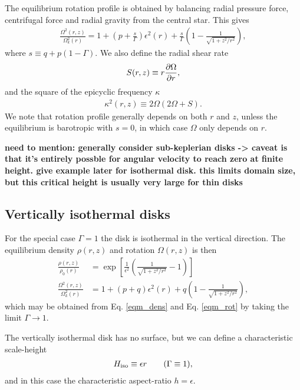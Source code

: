 The equilibrium rotation profile is obtained by balancing radial
pressure force, centrifugal force and radial gravity from the central
star. This gives 
\begin{align}\label{eqm_rot}
  \frac{\Omega^2(r,z)}{\Omega_k^2(r)}=1 +
  \left(p+\frac{s}{\Gamma}\right)\epsilon^2(r) 
  +\frac{s}{\Gamma} \left(1-\frac{1}{\sqrt{1+z^2/r^2}}\right), 
\end{align}
where $s\equiv q+p(1-\Gamma)$. We also define the radial shear rate  
\begin{align}
  S(r,z) \equiv r\frac{\partial\Omega}{\partial r},  
\end{align}
and the square of the epicyclic frequency $\kappa$ 
\begin{align}
  \kappa^2(r,z) \equiv 2\Omega(2\Omega + S). 
\end{align}
We note that rotation profile generally depends on both $r$ and $z$,
unless the equilibrium is barotropic with $s=0$, in which case
$\Omega$ only depends on $r$. 

{\bf need to mention: generally consider sub-keplerian disks -> caveat is that it's entirely possble for angular 
velocity to reach zero at finite height. give example later for isothermal disk. this limits domain size, but this critical height is usually
very large for thin disks}

\subsection{Vertically isothermal disks}
For the special case $\Gamma=1$ the disk is isothermal in the
vertical direction. The equilibrium density $\rho(r,z)$ and rotation
 $\Omega(r,z)$ is then 
 \begin{align}
   \frac{\rho(r,z)}{\rho_0(r)} &= \exp{\left[\frac{1}{\epsilon^2}\left(\frac{1}{\sqrt{1+z^2/r^2}}-1\right)\right]}\\   
   \frac{\Omega^2(r,z)}{\Omega_k^2(r)}& =1+ (p+q)\epsilon^2(r) + q\left(1 -
     \frac{1}{\sqrt{1+z^2/r^2}}\right),
 \end{align}
which may be obtained from Eq. \ref{eqm_dens} and Eq. \ref{eqm_rot} by
taking the limit $\Gamma\to 1$. 

The vertically isothermal disk has no surface, but we can define a
characteristic scale-height
\begin{align}
  H_\mathrm{iso} \equiv \epsilon r \quad\quad(\Gamma \equiv 1),   
\end{align} 
and in this case the characteristic aspect-ratio $h = \epsilon$. 

